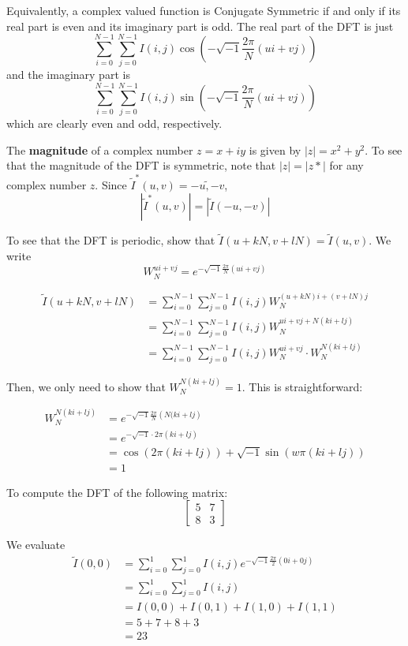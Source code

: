 \documentclass[a4paper]{article}
\begin{document}
Equivalently, a complex valued function is Conjugate Symmetric if and only if its real part is even and its imaginary part is odd. The real part of the DFT is just \[\sum_{i=0}^{N-1}\sum_{j=0}^{N-1}I(i, j)\cos{\left(-\sqrt{-1}\frac{2\pi}{N}\left(ui+vj\right)\right)}\] and the imaginary part is \[\sum_{i=0}^{N-1}\sum_{j=0}^{N-1}I(i, j)\sin{\left(-\sqrt{-1}\frac{2\pi}{N}\left(ui+vj\right)\right)}\] which are clearly even and odd, respectively.

The \textbf{magnitude} of a complex number $z=x+iy$ is given by $|z|=x^2+y^2$. To see that the magnitude of the DFT is symmetric, note that $|z|=|z*|$ for any complex number $z$. Since $\tilde{I}^*(u, v)=\tilde{-u, -v}$, \[\left|\tilde{I}^*(u, v)\right|=\left|\tilde{I}(-u, -v)\right|\]

To see that the DFT is periodic, show that $\tilde{I}(u+kN,v+lN)=\tilde{I}(u,v)$. We write \[W_N^{ui+vj}=e^{-\sqrt{-1}\frac{2\pi}{N}\left(ui+vj\right)}\]

\begin{align*}
 \tilde{I}(u+kN, v+lN)&=\sum_{i=0}^{N-1}\sum_{j=0}^{N-1}I(i, j)W_N^{(u+kN)i+(v+lN)j}
		\\&=\sum_{i=0}^{N-1}\sum_{j=0}^{N-1}I(i, j)W_N^{ui+vj+N(ki+lj)}
		\\&=\sum_{i=0}^{N-1}\sum_{j=0}^{N-1}I(i, j)W_N^{ui+vj}\cdot W_N^{N(ki+lj)}
\end{align*}

Then, we only need to show that $W_N^{N(ki+lj)}=1$. This is straightforward:

\begin{align*}
W_N^{N(ki+lj)}&=e^{-\sqrt{-1}\frac{2\pi}{N}\left(N(ki+lj\right)}
	    \\&=e^{-\sqrt{-1}\cdot2\pi\left(ki+lj\right)}
	    \\&=\cos\left(2\pi(ki+lj)\right)+\sqrt{-1}\sin\left(w\pi(ki+lj)\right)
	    \\&=1
\end{align*}

To compute the DFT of the following matrix: \[\begin{bmatrix}5&7\\8&3\end{bmatrix}\]

We evaluate \begin{align*}
	     \tilde{I}(0,0)&=\sum_{i=0}^1\sum_{j=0}^{1}I(i, j)e^{-\sqrt{-1}\frac{2\pi}{2}\left(0i + 0j\right)}
			 \\&=\sum_{i=0}^1\sum_{j=0}^{1}I(i,j)
			 \\&=I(0,0)+I(0,1)+I(1, 0)+I(1,1)
			 \\&=5+7+8+3
			 \\&=23
	    \end{align*}
	    
\end{document}
